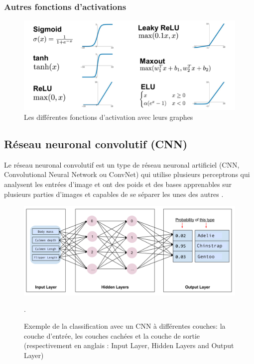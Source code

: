 	\subsubsection*{Autres fonctions d'activations}
	
	\begin{figure}[H]%
		\centering
		\includegraphics[width=12cm]{images/activation_functions.png}
		\caption{Les différentes fonctions d'activation avec leurs graphes}
		\label{fig:all_activation_function}
	\end{figure}
	
	
	
	\subsection{Réseau neuronal convolutif (CNN)}\label{sec:cnn}
	
	Le réseau neuronal convolutif est un type de réseau neuronal artificiel (CNN, Convolutional Neural Network ou ConvNet) qui utilise plusieurs perceptrons qui analysent les entrées d'image et ont des poids et des bases apprenables sur plusieurs parties d'images et capables de se séparer les unes des autres \cite{tammina2019transfer}.
	
	\begin{figure}[H]%
		\centering
		\includegraphics[width=\textwidth]{images/tensorflow_neuron_layer}
		\caption[Exemple de la classification avec un CNN a différentes couches]{Exemple de la classification avec un CNN à différentes couches: la couche d'entrée, les couches cachées et la couche de sortie (respectivement en anglais : Input Layer, Hidden Layers and Output Layer) \cite{ml2008python}}.
		\label{fig:cnn_layers}
	\end{figure}
	
